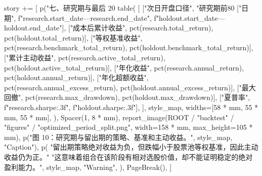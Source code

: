 \documentclass[UTF8,a4paper,fontset=fandol]{ctexart}
\begin{document}
\begin{ProjectCode}
    story += [
        p("七、研究期与最后 20%
        table(
            [
                ["次日开盘口径", "研究期前80%
                ["日期", f"{research.start_date}—{research.end_date}", f"{holdout.start_date}—{holdout.end_date}"],
                ["成本后累计收益", pct(research.total_return), pct(holdout.total_return)],
                ["等权基准收益", pct(research.benchmark_total_return), pct(holdout.benchmark_total_return)],
                ["累计主动收益", pct(research.active_total_return), pct(holdout.active_total_return)],
                ["年化收益", pct(research.annual_return), pct(holdout.annual_return)],
                ["年化超额收益", pct(research.annual_excess_return), pct(holdout.annual_excess_return)],
                ["最大回撤", pct(research.max_drawdown), pct(holdout.max_drawdown)],
                ["夏普率", f"{research.sharpe:.3f}", f"{holdout.sharpe:.3f}"],
            ],
            style_map,
            widths=[58 * mm, 55 * mm, 55 * mm],
        ),
        Spacer(1, 8 * mm),
        report_image(ROOT / "backtest" / "figures" / "optimized_period_split.png", width=158 * mm, max_height=105 * mm),
        p("图 10：研究期与留出期的策略、基准和主动收益。", style_map, "Caption"),
        p(
            "留出期策略绝对收益为负，但跌幅小于股票池等权基准，因此主动收益仍为正。"
            "这意味着组合在该阶段有相对选股价值，却不能证明稳定的绝对盈利能力。",
            style_map,
            "Warning",
        ),
        PageBreak(),
    ]


\end{ProjectCode}
\end{document}
